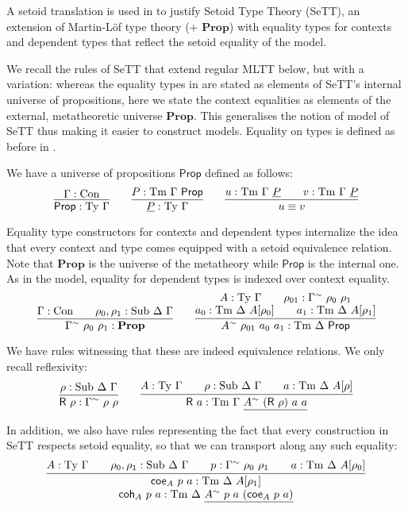 \documentclass[autoref]{llncs}
\newcommand{\GG}{\Gamma}
\newcommand{\DD}{\Delta}
\newcommand{\GD}{\Delta}
\newcommand{\coe}{\textsf{coe}}
\newcommand{\coh}{\textsf{coh}}
\newcommand{\tyj}[2]{#2 : \Ty\ #1}
\newcommand{\tmj}[3]{#2 : \Tm\ #1\ #3}
\newcommand{\subj}[3]{#1 : \mathrm{Sub}\ #2\ #3}
\newcommand{\Prop}{\textsf{Prop}}
\newcommand{\mProp}{\mathbf{Prop}}
\newcommand{\Con}{\mathrm{Con}}
\newcommand{\Ty}{\mathrm{Ty}}
\newcommand{\Tm}{\mathrm{Tm}}
\newcommand{\Sub}{\mathrm{Sub}}
\begin{document}
A setoid translation is used in \cite{mpc19} to justify Setoid Type Theory
(SeTT), an extension of Martin-L\"of type theory (+ $\mProp$) with equality
types for contexts and dependent types that reflect the setoid equality of the
model.

We recall the rules of SeTT that extend regular MLTT below, but with a
variation: whereas the equality types in \cite{mpc19} are stated as elements of
SeTT's internal universe of propositions, here we state the context equalities
as elements of the external, metatheoretic universe $\mProp$. This generalises the
notion of model of SeTT thus making it easier to construct models. Equality on
types is defined as before in \cite{mpc19}.

We have a universe of propositions $\Prop$ defined as follows:
\[
\infer{
  \Prop : \Ty\ \GG
}{
  \GG : \Con
}
\qquad
\infer{
  \underline{P} : \Ty\ \GG
}{
  P : \Tm\ \GG\ \Prop
}
\qquad
\infer{
  u \equiv v\vphantom{\Prop}
}{
  u : \Tm\ \GG\ \underline{P} && v : \Tm\ \GG\ \underline{P}
}
\]

Equality type constructors for contexts and dependent types internalize the idea
that every context and type comes equipped with a setoid equivalence
relation. Note that $\mProp$ is the universe of the metatheory while $\Prop$ is
the internal one. As in the model, equality for dependent types is indexed over context
equality.
\[
\infer{
  \GG^\sim\ \rho_0\ \rho_1 : \mProp
}{
  \GG : \Con \qquad \subj{\rho_0, \rho_1}{\DD}{\GG}
}
\qquad
\infer{
  A^{\sim}\ \rho_{01}\ a_0\ a_1 : \Tm\ \DD\ \Prop
}{
  \deduce{
    a_0 : \Tm\ \DD\ A[\rho_0] \qquad a_1 : \Tm\ \DD\ A[\rho_1]
  }{
    A : \Ty\ \GG \qquad \rho_{01} : \GG^{\sim}\ \rho_0\ \rho_1
  }
}
\]

We have rules witnessing that these are indeed equivalence relations. We only
recall reflexivity:
\[
\infer{
  \textsf{R}\ \rho : \GG^\sim\ \rho\ \rho
}{
  \rho : \Sub\ \GD\ \GG
}
\qquad
\infer{
  \textsf{R}\ a : \Tm\ \GG\ \underline{A^\sim\ (\textsf{R}\ \rho)\ a\ a}
}{
  A : \Ty\ \GG
  \qquad
  \rho : \Sub\ \GD\ \GG
  \qquad
  a : \Tm\ \GD\ A[\rho]
}
\]

In addition, we also have rules representing the fact that every construction in
SeTT respects setoid equality, so that we can transport along any such equality:
    \[
    \infer{
      \deduce{
        \tmj{\GD}{\coh_A\ p\ a}{\underline{A^\sim\ p\ a\ (\coe_A\ p\ a)}}
      }{
        \tmj{\GD}{\coe_A\ p\ a}{A[\rho_1]}
      }
    }{
      \tyj{\GG}{A} \qquad \subj{\rho_0, \rho_1}{\GD}{\GG} \qquad
      p : \GG^\sim\ \rho_0\ \rho_1\qquad
      \tmj{\GD}{a}{A[\rho_0]}
    }
    \]
\end{document}
